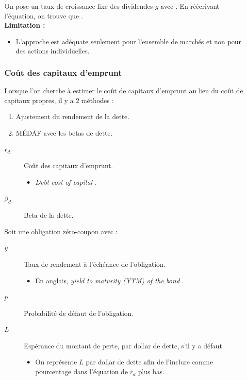 \documentclass[10pt, french]{article}
\begin{document}
\begin{multicols*}{2}
\begin{definitionNOHFILLprop}
On pose un taux de croissance fixe des dividendes $g$ avec . En réécrivant l'équation, on trouve que .\\

\textbf{Limitation :}
\begin{itemize}
	\item	L'approche est adéquate seulement pour l'ensemble de marchés et non pour des actions individuelles.
\end{itemize}
\end{definitionNOHFILLprop}



\columnbreak
\subsubsection{Coût des capitaux d'emprunt}
Lorsque l'on cherche à estimer le coût de capitaux d'emprunt au lieu du coût de capitaux propres, il y a 2 méthodes : 
\begin{enumerate}
	\item	Ajustement du rendement de la dette.
	\item	MÉDAF avec les betas de dette.
\end{enumerate}

\begin{distributions}[Notation]
\begin{description}
	\item[$r_{d}$]	Coût des capitaux d'emprunt.
		\begin{itemize}
		\item	\og \textit{Debt cost of capital} \fg{}.
		\end{itemize}
	\item[$\beta_{d}$]	Beta de la dette.
\end{description}

Soit une obligation zéro-coupon avec :
\begin{description}
	\item[$y$]	Taux de rendement à l'échéance de l'obligation.
		\begin{itemize}
		\item	En anglais, \og \textit{yield to maturity (YTM) of the bond} \fg{}.
		\end{itemize}
	\item[$p$]	Probabilité de défaut de l'obligation.
	\item[$L$]	Espérance du montant de perte, par dollar de dette, s'il y a défaut
		\begin{itemize}
		\item	On représente $L$ par dollar de dette afin de l'inclure comme pourcentage dans l'équation de $r_{d}$ plus bas.
		\end{itemize}
\end{description}
\end{distributions}



\end{multicols*}
\end{document}
